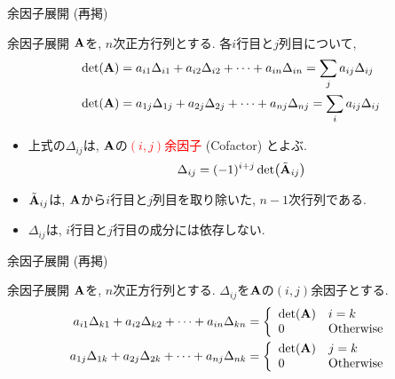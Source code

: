 \documentclass[dvipdfmx,notheorems,t]{beamer}
\begin{document}
\begin{frame}{余因子展開 (再掲)}
\begin{block}{余因子展開}
  $\vb{A}$を, $n$次正方行列とする. 各$i$行目と$j$列目について,
  \begin{align*}
    \det(\vb{A}) &= a_{i1} \Delta_{i1} + a_{i2} \Delta_{i2} + \cdots + a_{in} \Delta_{in}
      = \sum_j a_{ij} \Delta_{ij} \\
    \det(\vb{A}) &= a_{1j} \Delta_{1j} + a_{2j} \Delta_{2j} + \cdots + a_{nj} \Delta_{nj}
      = \sum_i a_{ij} \Delta_{ij}
  \end{align*}
\end{block}

\begin{itemize}
  \item 上式の$\Delta_{ij}$は, $\vb{A}$の\textcolor{red}{$(i, j)$余因子} (Cofactor) とよぶ.
  $$\Delta_{ij} = (-1)^{i + j} \det(\tilde{\vb{A}}_{ij})$$
  \item $\tilde{\vb{A}}_{ij}$は, $\vb{A}$から$i$行目と$j$列目を取り除いた, $n - 1$次行列である.
  \item $\Delta_{ij}$は, $i$行目と$j$行目の成分には依存しない.
\end{itemize}
\end{frame}

\begin{frame}{余因子展開 (再掲)}
\begin{block}{余因子展開}
  $\vb{A}$を, $n$次正方行列とする.
  $\Delta_{ij}$を$\vb{A}$の$(i, j)$余因子とする.
  \begin{align*}
    a_{i1} \Delta_{k1} + a_{i2} \Delta_{k2} + \cdots + a_{in} \Delta_{kn}
      &= \left\{ \begin{array}{ll} \det(\vb{A}) & i = k \\ 0 & \text{Otherwise} \end{array} \right. \\
    a_{1j} \Delta_{1k} + a_{2j} \Delta_{2k} + \cdots + a_{nj} \Delta_{nk}
      &= \left\{ \begin{array}{ll} \det(\vb{A}) & j = k \\ 0 & \text{Otherwise} \end{array} \right.
  \end{align*}
\end{block}
\end{frame}
\end{document}

